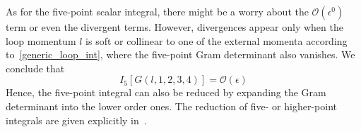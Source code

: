 As for the five-point scalar integral, there might be a worry about the $\mathcal{O}(\epsilon^0)$ term or even the divergent terms.
However, divergences appear only when the loop momentum $l$ is soft or collinear to one of the external momenta according to~\cref{generic_loop_int}, where the five-point Gram determinant also vanishes. 
We conclude that
\begin{equation}
I_5[G(l,1,2,3,4)] = \mathcal{O}(\epsilon)
\end{equation}
Hence, the five-point integral can also be reduced by expanding the Gram determinant into the lower order ones.
The reduction of five- or higher-point integrals are given explicitly in~\cite{Gluza:2010ws}.
%
%





